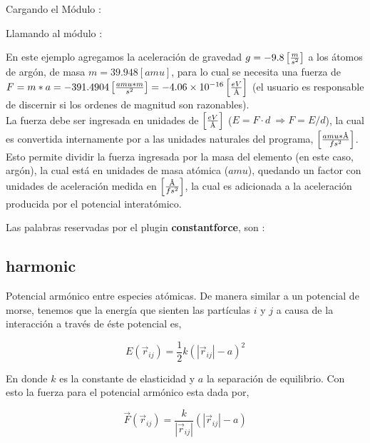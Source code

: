 Cargando el M\'odulo :

Llamando al m\'odulo :


En este ejemplo agregamos la aceleraci\'on de gravedad $g=-9.8\left[m\over
s^2\right]$ a los \'atomos de arg\'on, de masa $m=39.948 [amu]$, para lo cual se
necesita una fuerza de $F=m*a=-391.4904 \left[amu*m\over
s^2\right]=-4.06\times10^{-16}\left[eV\over \text\AA\right]$ (el usuario es
responsable de discernir si los ordenes de magnitud son razonables).\\

La fuerza debe ser ingresada en unidades de $\left[eV \over \text\AA\right]$
($E=F\cdot d\ \Rightarrow F=E/d$), la cual es convertida internamente por
{\lpmd} a las unidades naturales del programa, $\left[amu*\text\AA\over
fs^2\right]$. Esto permite dividir la fuerza ingresada por la masa del elemento
(en este caso, arg\'on), la cual est\'a en unidades de masa at\'omica ($amu$),
quedando un factor con unidades de aceleraci\'on medida en $\left[\text\AA\over
fs^2\right]$, la cual es adicionada a la aceleraci\'on producida por el
potencial interat\'omico.


Las palabras reservadas por el plugin \textbf{constantforce}, son :


\subsection{harmonic}
Potencial arm\'onico entre especies at\'omicas. De manera similar a un potencial
de morse, tenemos que la energ\'ia que sienten las part\'iculas $i$ y $j$ a
causa de la interacci\'on a trav\'es de \'este potencial es,

$$E(\vec{r}_{ij}) = \frac{1}{2}k\left(|\vec{r}_{ij}|-a\right)^2$$

En donde $k$ es la constante de elasticidad y $a$ la separaci\'on de equilibrio.
Con esto la fuerza para el potencial arm\'onico esta dada por,

$$\vec{F}(\vec{r}_{ij}) = \frac{k}{|\vec{r}_{ij}|}\left(|\vec{r}_{ij}|-a\right)$$

